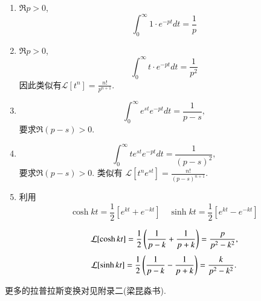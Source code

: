 \begin{solution}
        


    \begin{enumerate}
        \item $\Re p > 0$, 
            $$\int_{0}^{\infty} 1 \cdot e^{-p t} dt = \frac{1}{p}$$
        \item  $\Re p > 0$, 
            $$\int_{0}^{\infty} t \cdot e^{-p t} dt = \frac{1}{p^2}$$
            因此类似有$\mathcal{L}[t^n] = \frac{n!}{p^{n+1}}$.
        \item $$
            \int_{0}^{\infty} e^{s t} e^{-p t} dt = \frac{1}{p-s} , 
        $$
        要求$\Re (p-s) > 0$.
        \item 
        $$
        \int_{0}^{\infty} t e^{s t} e^{-p t} dt = \frac{1}{(p-s)^2} ,
        $$
        要求$\Re (p-s) > 0$.  
    类似有 $\mathcal{L}[t^n e^{s t}] = \frac{n!}{(p-s)^{n+1}}$.
        \item 利用
        $$
         \cosh{k t}  = \frac{1}{2} \left[ e^{kt} + e^{-kt}\right] \quad 
         \sinh{k t}  = \frac{1}{2} \left[ e^{kt} - e^{-kt}\right] 
        $$

        $$
        \mathcal{L}[ \cosh{k t} ] = {\frac{1}{2}} \left( \frac{1}{p-k} + \frac{1}{p+k} \right) = \frac{p}{p^2 - k^2} ,
        $$
        $$
        \mathcal{L}[ \sinh{k t} ] = {\frac{1}{2}} \left( \frac{1}{p-k} - \frac{1}{p+k} \right) = \frac{k}{p^2 - k^2} .
        $$
    \end{enumerate}
\end{solution}
更多的拉普拉斯变换对见附录二(梁昆淼书).

